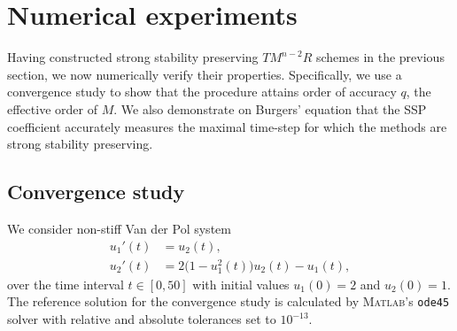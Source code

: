 \section{Numerical experiments}\label{sec:numerics}
Having constructed strong stability preserving $TM^{n-2}R$ schemes in the previous
section, we now numerically verify their properties.
Specifically, we use a convergence study to show that the procedure
attains order of accuracy $q$, the effective order of $M$.
We also demonstrate on Burgers' equation that the
SSP coefficient accurately measures the maximal time-step for which the
methods are strong stability preserving.

\subsection{Convergence study}\label{subsec:convergence}
We consider non-stiff Van der Pol system
\begin{equation}\label{eq:conv_eq}
	\begin{split}
    		u_1'(t) &= u_2(t), \\
    		u_2'(t) &= 2\bigl(1 - u_1^2(t)\bigr)u_2(t) - u_1(t), 
    \end{split}
\end{equation}
over the time interval $t \in [0, 50]$ with initial values $u_1(0) = 2$ and $u_2(0) = 1$.
The reference solution for the convergence study is calculated by \textsc{Matlab}'s 
\texttt{ode45} solver with relative and absolute tolerances set to $10^{-13}$.

